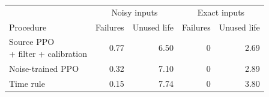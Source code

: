 {\small\setlength{\tabcolsep}{3pt}\renewcommand{\arraystretch}{1.08}%
\begin{tabular}{@{}lrrrr@{}}
\toprule
 & \multicolumn{2}{c}{Noisy inputs} & \multicolumn{2}{c}{Exact inputs}\\
\cmidrule(lr){2-3}\cmidrule(l){4-5}
Procedure & Failures & Unused life & Failures & Unused life\\
\midrule
\shortstack[l]{Source PPO\\+ filter + calibration} & 0.77 & 6.50 & 0 & 2.69\\
Noise-trained PPO & 0.32 & 7.10 & 0 & 2.89\\
Time rule & 0.15 & 7.74 & 0 & 3.80\\
\bottomrule
\end{tabular}}
